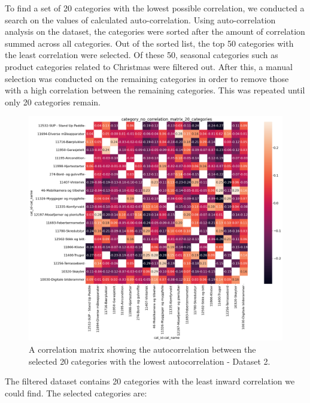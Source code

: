 To find a set of 20 categories with the lowest possible correlation, we conducted a search on the values of calculated auto-correlation.
Using auto-correlation analysis on the dataset, the categories were sorted after the amount of correlation summed across all categories.
Out of the sorted list, the top 50 categories with the least correlation were selected.
Of these 50, seasonal categories such as product categories related to Christmas were filtered out.
After this, a manual selection was conducted on the remaining categories in order to remove those with a high correlation between the remaining categories.
This was repeated until only 20 categories remain.
\begin{figure}[H]
  \centering
  \includegraphics[width=\textwidth]{./figs/dataset/category_no_correlation_matrix_20_categories.png}
  \hfill
  \caption{A correlation matrix showing the autocorrelation between the selected 20 categories with the lowest autocorrelation - Dataset 2.}
  \label{fig:dataset:heatmap_20_no_correlating}
\end{figure}



The filtered dataset contains 20 categories with the least inward correlation we could find.
The selected categories are:

